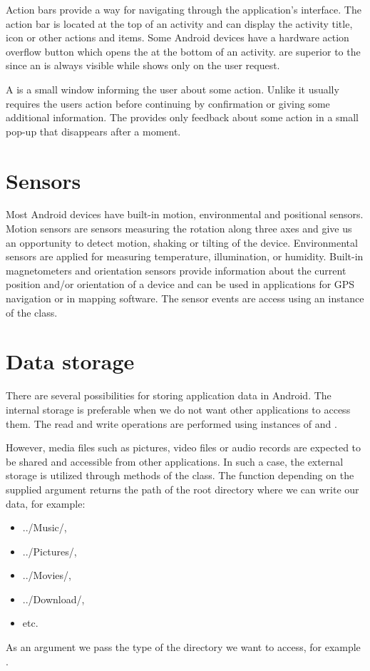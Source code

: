 Action bars provide a way for navigating through the application's interface. 
The action bar is located at the top of an activity and can display the activity title, icon or other actions and items.
Some Android devices have a hardware action overflow button which opens the  at the bottom of an activity. 
 are superior to the  since an  is always visible while  shows only on the user request.

A  is a small window informing the user about some action. 
Unlike  it usually requires the users action before continuing by confirmation or giving some additional information.
The  provides only feedback about some action in a small pop-up that disappears after a moment.

\section{Sensors}

Most Android devices have built-in motion, environmental and positional sensors.
Motion sensors are sensors measuring the rotation along three axes and give us an opportunity to detect motion, shaking or tilting of the device. 
Environmental sensors are applied for measuring temperature, illumination, or humidity.
Built-in magnetometers and orientation sensors provide information about the current position and/or orientation of a device and can be used in applications for GPS navigation or in mapping software. 
The sensor events are access using an instance of the  class.

\section{Data storage}

There are several possibilities for storing application data in Android. 
The internal storage is preferable when we do not want other applications to access them. 
The read and write operations are performed using instances of  and .

However, media files such as pictures, video files or audio records are expected to be shared and accessible from other applications.
In such a case, the external storage is utilized through methods of the  class.
The function  depending on the supplied argument returns the path of the root directory where we can write our data, for example: 
\begin{itemize}
\item{../Music/,}
\item{../Pictures/,}
\item{../Movies/,}
\item{../Download/,}
\item{etc.}
\end{itemize}
As an argument we pass the type of the directory we want to access, for example .

